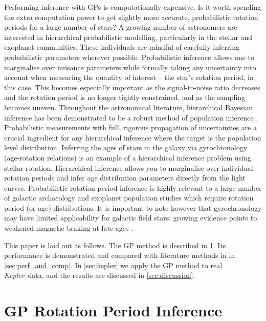 \documentclass[a4paper,fleqn,usenatbib,useAMS]{mnras}
\newcommand{\response}[1]{{#1}}
\newcommand{\Kepler}{{\it Kepler}}
\newcommand{\kepler}{\Kepler}
\newcommand{\eg}{{\it e.g.}}
\begin{document}
\response{Performing inference with GPs is computationally expensive.
Is it worth spending the extra computation power to get slightly more
accurate, probabilistic rotation periods for a large number of stars?
A growing number of astronomers are interested in hierarchical probabilistic
modelling, particularly in the stellar and exoplanet communities.
These individuals are mindful of carefully inferring probabilistic parameters
wherever possible.
Probabilistic inference allows one to marginalise over nuisance
parameters while formally taking any uncertainty into account when
measuring the quantity of interest -- the star's rotation period, in
this case.
This becomes especially important as the signal-to-noise ratio
decreases and the rotation period is no longer tightly constrained,
and as the sampling becomes uneven.
Throughout the astronomical literature, hierarchical Bayesian
inference has been demonstrated to be a robust method of population
inference \citep[\eg][]{Hogg2010, Foremanmackey2014, Wolfgang2015, Rogers2015}.
Probabilistic measurements with full, rigorous propagation of
uncertainties are a crucial ingredient for any hierarchical inference
where the target is the population level distribution.
Inferring the ages of stars in the galaxy via gyrochronology (age-rotation
relations) \citep[\eg][]{Skumanich1972, Kawaler1989, Barnes2003, Barnes2007}
is an example of a hierarchical inference problem using stellar rotation.
Hierarchical inference allows you to marginalise over individual rotation
periods and infer age distribution parameters directly from the light curves.
Probabilistic rotation period inference is highly relevant to a large number
of galactic archaeology and exoplanet population studies which require
rotation period (or age) distributions.
It is important to note however that gyrochronology may have limited
applicability for galactic field stars: growing evidence points to weakened
magnetic braking at late ages \citep{Angus2015, vanSaders2016}.}

This paper is laid out as follows.
The GP method is described in \textsection \ref{sec:method}.
Its performance is demonstrated and compared with literature methods in
in \textsection \ref{sec:perf_and_comp}.
In \textsection \ref{sec:kepler} we apply the GP method to real \kepler\ data,
and the results are discussed in \textsection \ref{sec:discussion}.

\section{GP Rotation Period Inference}
\label{sec:method}
\end{document}
